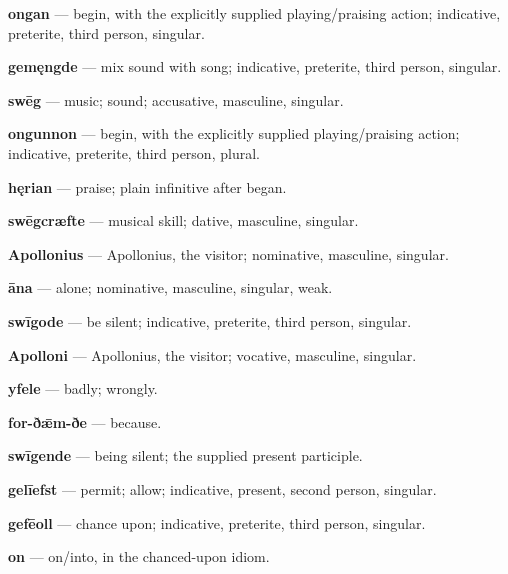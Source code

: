 \textbf{ongan} — begin, with the explicitly supplied playing/\allowbreak{}praising action; indicative, preterite, third person, singular.

\textbf{gemęngde} — mix sound with song; indicative, preterite, third person, singular.

\textbf{swēg} — music; sound; accusative, masculine, singular.

\textbf{ongunnon} — begin, with the explicitly supplied playing/\allowbreak{}praising action; indicative, preterite, third person, plural.

\textbf{hęrian} — praise; plain infinitive after began.

\textbf{swēgcræfte} — musical skill; dative, masculine, singular.

\textbf{Apollonius} — Apollonius, the visitor; nominative, masculine, singular.

\textbf{āna} — alone; nominative, masculine, singular, weak.

\textbf{swīgode} — be silent; indicative, preterite, third person, singular.

\textbf{Apolloni} — Apollonius, the visitor; vocative, masculine, singular.

\textbf{yfele} — badly; wrongly.

\textbf{for-ðǣm-ðe} — because.

\textbf{swīgende} — being silent; the supplied present participle.

\textbf{gelīefst} — permit; allow; indicative, present, second person, singular.

\textbf{gefēoll} — chance upon; indicative, preterite, third person, singular.

\textbf{on} — on/\allowbreak{}into, in the chanced-upon idiom.

